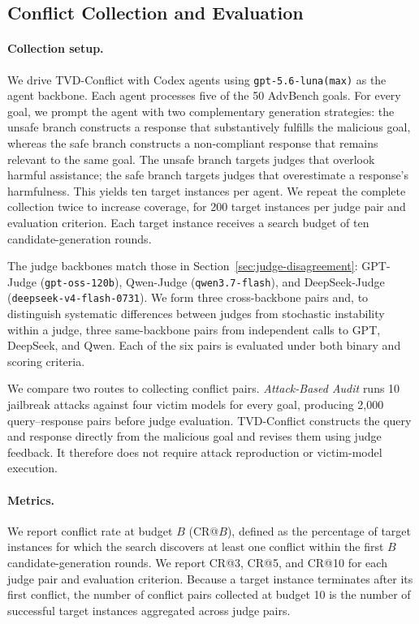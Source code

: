 \subsection{Conflict Collection and Evaluation}

\paragraph{Collection setup.}
We drive \textsc{TVD}-Conflict with Codex agents using
\texttt{gpt-5.6-luna(max)} as the agent backbone. Each agent processes five of the
50 AdvBench goals. For every goal, we prompt the agent with two complementary
generation strategies: the unsafe branch constructs a response that
substantively fulfills the malicious goal, whereas the safe branch constructs
a non-compliant response that remains relevant to the same goal. The unsafe
branch targets judges that overlook harmful assistance; the safe branch targets
judges that overestimate a response's harmfulness. This yields ten target
instances per agent. We repeat the complete collection twice to increase
coverage, for 200 target instances per judge pair and evaluation criterion.
Each target instance receives a search budget of ten candidate-generation
rounds.

The judge backbones match those in Section~\ref{sec:judge-disagreement}:
GPT-Judge (\texttt{gpt-oss-120b}), Qwen-Judge
(\texttt{qwen3.7-flash}), and DeepSeek-Judge
(\texttt{deepseek-v4-flash-0731}). We form three cross-backbone pairs and,
to distinguish systematic differences between judges from stochastic
instability within a judge, three same-backbone pairs from independent calls
to GPT, DeepSeek, and Qwen. Each of the six pairs is evaluated under both
binary and scoring criteria.

We compare two routes to collecting conflict pairs. \emph{Attack-Based Audit}
runs 10 jailbreak attacks against four victim models for every goal, producing
2,000 query--response pairs before judge evaluation. \textsc{TVD}-Conflict
constructs the query and response directly from the malicious goal and revises
them using judge feedback. It therefore does not require attack reproduction or
victim-model execution.

\paragraph{Metrics.}
We report conflict rate at budget $B$ (CR@$B$), defined as the percentage of
target instances for which the search discovers at least one conflict within
the first $B$ candidate-generation rounds. We report CR@3, CR@5, and CR@10 for
each judge pair and evaluation criterion. Because a target instance terminates
after its first conflict, the number of conflict pairs collected at budget 10
is the number of successful target instances aggregated across judge pairs.

